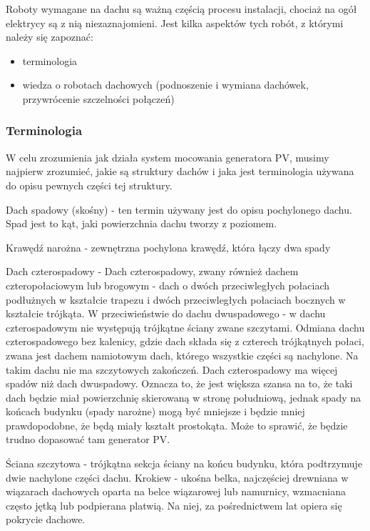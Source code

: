 \documentclass[12pt,a4paper]{article}
\begin{document}
Roboty wymagane na dachu są ważną częścią procesu instalacji, chociaż na 
ogół elektrycy są z nią niezaznajomieni. Jest kilka aspektów tych robót, 
z którymi należy się zapoznać: 

\begin{itemize}
\item terminologia 
\item wiedza o robotach dachowych (podnoszenie i wymiana dachówek, 
przywrócenie szczelności połączeń)
\end{itemize}

\subsubsection{Terminologia}


W celu zrozumienia jak działa system mocowania generatora PV, musimy 
najpierw zrozumieć, jakie są struktury dachów i jaka jest terminologia 
używana do opisu pewnych części tej struktury. 

Dach spadowy (skośny) - ten termin używany jest do opisu pochylonego 
dachu. Spad jest to kąt, jaki powierzchnia dachu tworzy z poziomem. 

Krawędź narożna - zewnętrzna pochylona krawędź, która łączy dwa spady 

Dach czterospadowy -  Dach 
czterospadowy, zwany również dachem czteropołaciowym lub brogowym - 
dach o dwóch przeciwległych połaciach podłużnych w kształcie trapezu i 
dwóch przeciwległych połaciach bocznych w kształcie trójkąta. W 
przeciwieństwie do dachu dwuspadowego - w dachu czterospadowym nie 
występują trójkątne ściany zwane szczytami. Odmiana dachu 
czterospadowego bez kalenicy, gdzie dach składa się z czterech 
trójkątnych połaci, zwana jest dachem namiotowym dach, którego wszystkie 
części są nachylone. Na takim dachu nie ma szczytowych zakończeń. Dach 
czterospadowy ma więcej spadów niż dach dwuspadowy. Oznacza to, że jest 
większa szansa na to, że taki dach będzie miał powierzchnię skierowaną w 
stronę południową, jednak spady na końcach budynku (spady narożne) mogą 
być mniejsze i będzie mniej prawdopodobne, że będą miały kształt 
prostokąta. Może to sprawić, że będzie trudno dopasować tam generator 
PV. 

Ściana szczytowa - trójkątna sekcja ściany na końcu budynku, która 
podtrzymuje dwie nachylone części dachu. Krokiew - ukośna belka, 
najczęściej drewniana w wiązarach dachowych oparta na belce wiązarowej 
lub namurnicy, wzmacniana często jętką lub podpierana platwią. Na niej, 
za pośrednictwem lat opiera się pokrycie dachowe. 
\end{document}
